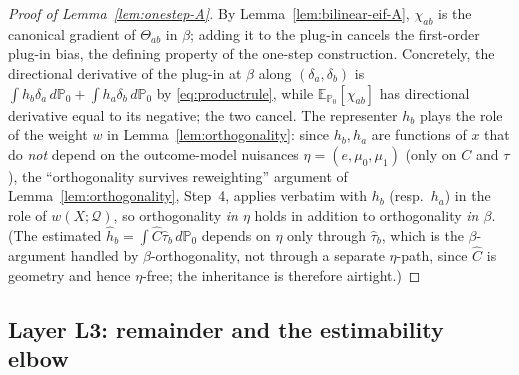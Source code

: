 \begin{proof}[Proof of Lemma~\ref{lem:onestep-A}]
By Lemma~\ref{lem:bilinear-eif-A}, $\chi_{ab}$ is the canonical gradient of $\Theta_{ab}$ in
$\beta$; adding it to the plug-in cancels the first-order plug-in bias, the defining property of
the one-step construction. Concretely, the directional derivative of the plug-in at $\beta$
along $(\delta_a,\delta_b)$ is $\int h_b\delta_a\,d\mathbb{P}_0+\int h_a\delta_b\,d\mathbb{P}_0$
by \eqref{eq:productrule}, while $\mathbb{E}_{\mathbb{P}_0}[\chi_{ab}]$ has directional derivative
equal to its negative; the two cancel. The representer $h_b$ plays the role of the weight $w$ in
Lemma~\ref{lem:orthogonality}: since $h_b,h_a$ are functions of $x$ that do \emph{not} depend on
the outcome-model nuisances $\eta=(e,\mu_0,\mu_1)$ (only on $C$ and $\tau$), the
``orthogonality survives reweighting'' argument of Lemma~\ref{lem:orthogonality}, Step~4, applies
verbatim with $h_b$ (resp.\ $h_a$) in the role of $w(X;\mathcal{Q})$, so orthogonality \emph{in
$\eta$} holds in addition to orthogonality \emph{in $\beta$}. (The estimated $\hat h_b=\int\hat
C\hat\tau_b\,d\mathbb{P}_0$ depends on $\eta$ only through $\hat\tau_b$, which is the
$\beta$-argument handled by $\beta$-orthogonality, not through a separate $\eta$-path, since
$\hat C$ is geometry and hence $\eta$-free; the inheritance is therefore airtight.)
\end{proof}

\subsection{Layer L3: remainder and the estimability elbow}

